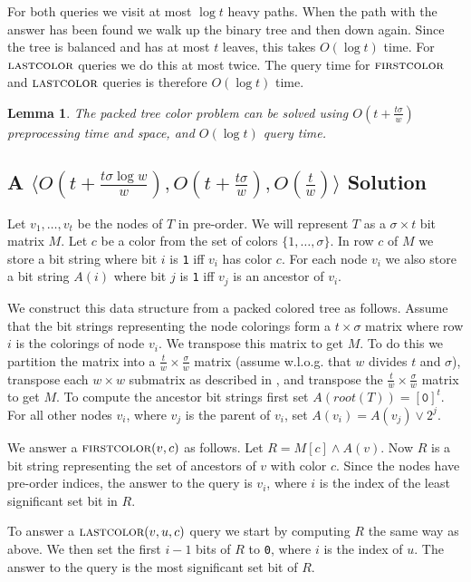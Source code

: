\documentclass[11pt]{article}
\newcommand{\tree}{\ensuremath{T}}
\newcommand{\fca}{\ensuremath{\textsc{firstcolor}}}
\newcommand{\lca}{\ensuremath{\textsc{lastcolor}}}
\newcommand{\band}{\ensuremath{\wedge}}
\newcommand{\bor}{\ensuremath{\vee}}
\newtheorem{lemma}{Lemma}
\begin{document}
For both queries we visit at most $\log t$ heavy paths. When the path with the answer has been found we walk up the binary tree and then down again. Since the tree is balanced and has at most $t$ leaves, this takes $O(\log t)$ time. For $\lca$ queries we do this at most twice. The query time for $\fca$ and $\lca$ queries is therefore $O(\log t)$ time.

\begin{lemma}
The packed tree color problem can be solved using $O(t+\frac{t\sigma}{w})$ preprocessing time and space, and $O(\log t)$ query time.
\end{lemma}

\subsection{A $\langle O(t+\frac{t\sigma\log w}{w}),O(t+\frac{t\sigma}{w}),O(\frac t w) \rangle$ Solution}



Let $v_1,\ldots,v_t$ be the nodes of $\tree$ in pre-order. We will represent $\tree$ as a $\sigma \times t$ bit matrix $M$. Let $c$ be a color from the set of colors $\{1,\ldots,\sigma\}$. In row $c$ of $M$ we store a bit string where bit $i$ is \texttt{1} iff $v_i$ has color $c$. For each node $v_i$ we also store a bit string $A(i)$ where bit $j$ is \texttt{1} iff $v_j$ is an ancestor of $v_i$.

We construct this data structure from a packed colored tree as follows. Assume that the bit strings representing the node colorings form a $t \times \sigma$ matrix where row $i$ is the colorings of node $v_i$. We transpose this matrix to get $M$. To do this we partition the matrix into a $\frac t w \times \frac \sigma w$ matrix (assume w.l.o.g. that $w$ divides $t$ and $\sigma$), transpose each $w\times w$ submatrix as described in \cite{thorup2002randomized}, and transpose the $\frac t w \times \frac \sigma w$ matrix to get $M$. To compute the ancestor bit strings first set $A(root(\tree))=[\mathtt{0}]^t$. For all other nodes $v_i$, where $v_j$ is the parent of $v_i$, set $A(v_i)=A(v_j)\bor 2^j$.

We answer a $\fca(v,c)$ as follows. Let $R=M[c]\band A(v)$. Now $R$ is a bit string representing the set of ancestors of $v$ with color $c$. Since the nodes have pre-order indices, the answer to the query is $v_i$, where $i$ is the index of the least significant set bit in $R$. 

To answer a $\lca(v,u,c)$ query we start by computing $R$ the same way as above. We then set the first $i-1$ bits of $R$ to \texttt{0}, where $i$ is the index of $u$. The answer to the query is the most significant set bit of $R$.
\end{document}
